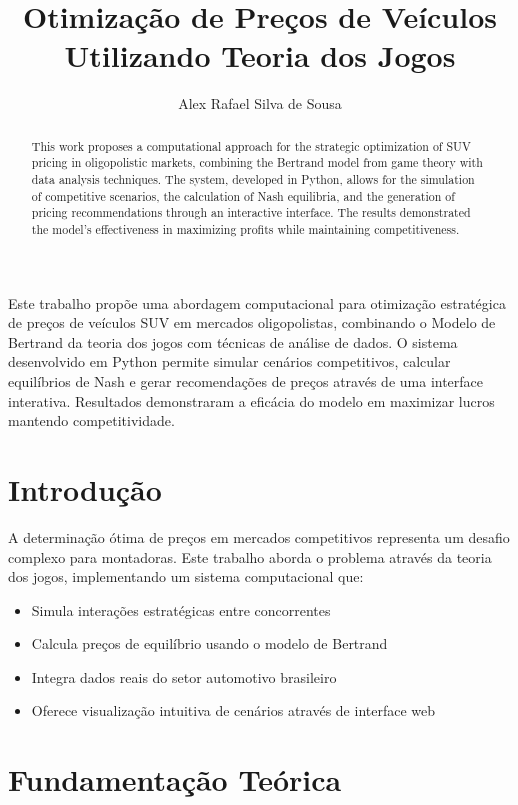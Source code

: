 \documentclass[12pt]{article}
\title{Otimização de Preços de Veículos\\Utilizando Teoria dos Jogos}
\author{Alex Rafael Silva de Sousa\inst{1}}
\begin{document}
 

\maketitle

\begin{abstract}
This work proposes a computational approach for the strategic optimization of SUV pricing in oligopolistic markets, combining the Bertrand model from game theory with data analysis techniques. The system, developed in Python, allows for the simulation of competitive scenarios, the calculation of Nash equilibria, and the generation of pricing recommendations through an interactive interface. The results demonstrated the model's effectiveness in maximizing profits while maintaining competitiveness.
\end{abstract}

\begin{resumo}
Este trabalho propõe uma abordagem computacional para otimização estratégica de preços de veículos SUV em mercados oligopolistas, combinando o Modelo de Bertrand da teoria dos jogos com técnicas de análise de dados. O sistema desenvolvido em Python permite simular cenários competitivos, calcular equilíbrios de Nash e gerar recomendações de preços através de uma interface interativa. Resultados demonstraram a eficácia do modelo em maximizar lucros mantendo competitividade.
\end{resumo}

\section{Introdução}
A determinação ótima de preços em mercados competitivos representa um desafio complexo para montadoras. Este trabalho aborda o problema através da teoria dos jogos, implementando um sistema computacional que:

\begin{itemize}
\item Simula interações estratégicas entre concorrentes
\item Calcula preços de equilíbrio usando o modelo de Bertrand
\item Integra dados reais do setor automotivo brasileiro
\item Oferece visualização intuitiva de cenários através de interface web
\end{itemize}

\section{Fundamentação Teórica}
\end{document}
